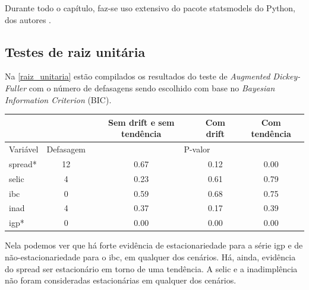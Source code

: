 \documentclass[a4paper,
               article,
               12pt,
               openany,
               oneside,
               english,
               brazil]{abntex2}
\numberwithin{equation}{section}
\begin{document}
   Durante todo o capítulo, faz-se uso extensivo do pacote statsmodels do Python, dos autores \textcite{statsmodels}.

   \subsection{Testes de raiz unitária}
   
   Na \autoref{raiz_unitaria} estão compilados os resultados do teste de \textit{Augmented Dickey-Fuller} com o número de defasagens sendo escolhido com base no \textit{Bayesian Information Criterion} (BIC).

    \begin{table}[ht]
        {%
            \begin{tabular}{lcccc}
                \midrule
                & \multicolumn{1}{c}{} & \multicolumn{1}{C{3cm}}{Sem drift e sem tendência} & \multicolumn{1}{C{3cm}}{Com drift} & \multicolumn{1}{C{3cm}}{Com tendência} \\
                \midrule
                Variável & Defasagem & \multicolumn{3}{c}{P-valor} \\
                \midrule
                spread*      &         12 &     0.67 &     0.12 &     0.00 \\
                selic        &          4 &     0.23 &     0.61 &     0.79 \\
                ibc          &          0 &     0.59 &     0.68 &     0.75 \\
                inad         &          4 &     0.37 &     0.17 &     0.39 \\
                igp*         &          0 &     0.00 &     0.00 &     0.00 \\
                \midrule
            \end{tabular}
            } 
            {}
    \end{table}

    Nela podemos ver que há forte evidência de estacionariedade para a série igp e de não-estacionariedade para o ibc, em qualquer dos cenários. Há, ainda, evidência do spread ser estacionário em torno de uma tendência. A selic e a inadimplência não foram consideradas estacionárias em qualquer dos cenários.
\end{document}
